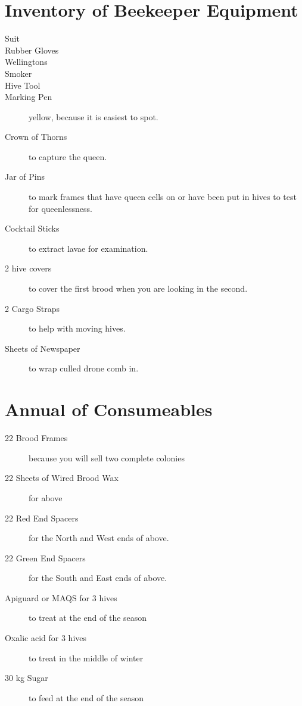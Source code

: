 \documentclass{./BeekeepingBook}
\begin{document}
\section{Inventory of Beekeeper Equipment}

\begin{description}
  \item[Suit]  
  \item[Rubber Gloves] 
  \item[Wellingtons] 
  \item[Smoker] 
  \item[Hive Tool] 
  \item[Marking Pen] yellow, because it is easiest to spot.
  \item[Crown of Thorns]  to capture the queen.
  \item[Jar of Pins]  to mark frames that have queen cells on or have been put in hives to test for queenlessness.
  \item[Cocktail Sticks]  to extract lavae for examination.
  \item[2 hive covers] to cover the first brood when you are looking in the second.
  \item[2 Cargo Straps] to help with moving hives. 
  \item[Sheets of Newspaper] to wrap culled drone comb in.
\end{description}

\section{Annual of Consumeables}

\begin{description}
  \item[22 Brood Frames] because you will sell two complete colonies
  \item[22 Sheets of Wired Brood Wax] for above 
  \item[22 Red End Spacers] for the North and West ends of above.
  \item[22 Green End Spacers] for the South and East ends of above.
  \item[Apiguard or MAQS for 3 hives] to treat at the end of the season
  \item[Oxalic acid for 3 hives] to treat in the middle of winter
  \item[30 kg Sugar] to feed at the end of the season
\end{description}
\end{document}
